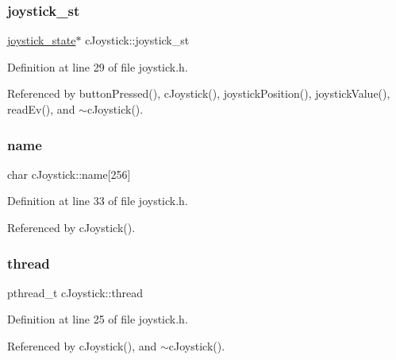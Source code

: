 \subsubsection{\texorpdfstring{joystick\+\_\+st}{joystick\_st}}
{\footnotesize\ttfamily \hyperlink{structjoystick__state}{joystick\+\_\+state}$\ast$ c\+Joystick\+::joystick\+\_\+st\hspace{0.3cm}{\ttfamily [private]}}



Definition at line 29 of file joystick.\+h.



Referenced by button\+Pressed(), c\+Joystick(), joystick\+Position(), joystick\+Value(), read\+Ev(), and $\sim$c\+Joystick().

\mbox{\label{classc_joystick_a4352d02cdee851f9c8c104915d3c006c}} 
\subsubsection{\texorpdfstring{name}{name}}
{\footnotesize\ttfamily char c\+Joystick\+::name\mbox{[}256\mbox{]}\hspace{0.3cm}{\ttfamily [private]}}



Definition at line 33 of file joystick.\+h.



Referenced by c\+Joystick().

\mbox{\label{classc_joystick_ac95e179f087f21a4d364cf6e9984d60b}} 
\subsubsection{\texorpdfstring{thread}{thread}}
{\footnotesize\ttfamily pthread\+\_\+t c\+Joystick\+::thread\hspace{0.3cm}{\ttfamily [private]}}



Definition at line 25 of file joystick.\+h.



Referenced by c\+Joystick(), and $\sim$c\+Joystick().

\mbox{\label{classc_joystick_afefd351be965e4953b5eb03073e99ad9}} 
